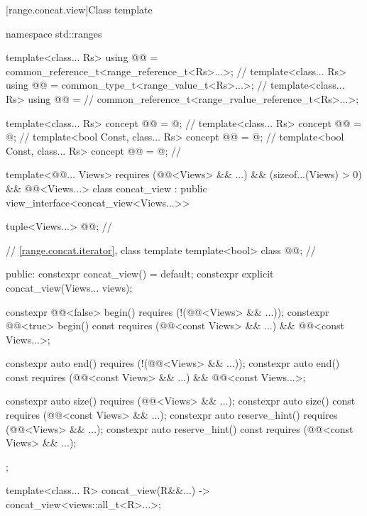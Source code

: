 [range.concat.view]{Class template }

%
\begin{codeblock}
namespace std::ranges {
  template<class... Rs>
  using @@ = common_reference_t<range_reference_t<Rs>...>;      // \expos
  template<class... Rs>
  using @@ = common_type_t<range_value_t<Rs>...>;                   // \expos
  template<class... Rs>
  using @@ =                                             // \expos
    common_reference_t<range_rvalue_reference_t<Rs>...>;

  template<class... Rs>
    concept @@ = @\seebelow@;     // \expos
  template<class... Rs>
    concept @@ = @\seebelow@;                     // \expos
  template<bool Const, class... Rs>
    concept @@ = @\seebelow@;        // \expos
  template<bool Const, class... Rs>
    concept @@ = @\seebelow@;        // \expos

  template<@@... Views>
    requires (@@<Views> && ...) && (sizeof...(Views) > 0) &&
              @@<Views...>
  class concat_view : public view_interface<concat_view<Views...>> {

    tuple<Views...> @@;                                             // \expos

    // \ref{range.concat.iterator}, class template 
    template<bool> class @@;                                      // \expos

  public:
    constexpr concat_view() = default;
    constexpr explicit concat_view(Views... views);

    constexpr @@<false> begin() requires (!(@@<Views> && ...));
    constexpr @@<true> begin() const
      requires (@@<const Views> && ...) && @@<const Views...>;

    constexpr auto end() requires (!(@@<Views> && ...));
    constexpr auto end() const
      requires (@@<const Views> && ...) && @@<const Views...>;

    constexpr auto size() requires (@@<Views> && ...);
    constexpr auto size() const requires (@@<const Views> && ...);
    constexpr auto reserve_hint() requires (@@<Views> && ...);
    constexpr auto reserve_hint() const requires (@@<const Views> && ...);
  };

  template<class... R>
    concat_view(R&&...) -> concat_view<views::all_t<R>...>;
}
\end{codeblock}

